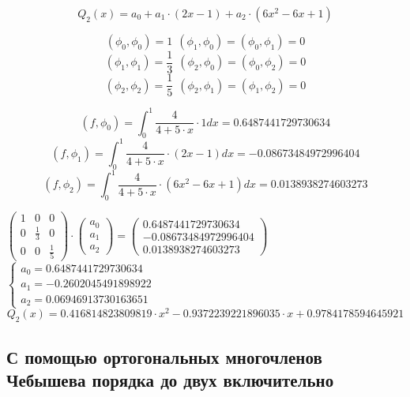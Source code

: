 \begin{displaymath}
Q_2(x) = a_0 + a_1 \cdot (2x - 1) + a_2 \cdot (6x^2 - 6x + 1)
\end{displaymath}

\begin{displaymath}
(\phi_0, \phi_0) = 1 \ \ (\phi_1, \phi_0) = (\phi_0, \phi_1) = 0
\end{displaymath}
\begin{displaymath}
(\phi_1, \phi_1) = \frac{1}{3} \ \ (\phi_2, \phi_0) = (\phi_0, \phi_2) = 0
\end{displaymath}
\begin{displaymath}
(\phi_2, \phi_2) = \frac{1}{5} \ \ (\phi_2, \phi_1) = (\phi_1, \phi_2) = 0
\end{displaymath}

\begin{displaymath}
(f, \phi_0) = \int_0^1 \frac{4}{4 + 5 \cdot x} \cdot 1 dx = 0.6487441729730634
\end{displaymath}
\begin{displaymath}
(f, \phi_1) = \int_0^1 \frac{4}{4 + 5 \cdot x} \cdot (2x - 1) dx = -0.08673484972996404
\end{displaymath}
\begin{displaymath}
(f, \phi_2) = \int_0^1 \frac{4}{4 + 5 \cdot x} \cdot (6x^2 - 6x + 1) dx = 0.0138938274603273
\end{displaymath}

$
\begin{pmatrix}
1 & 0 & 0
\\
0 & \frac{1}{3} & 0
\\
0 & 0 & \frac{1}{5}
\end{pmatrix}
\cdot
\begin{pmatrix}
a_0
\\
a_1
\\
a_2
\end{pmatrix}
=
\begin{pmatrix}
0.6487441729730634
\\
-0.08673484972996404
\\
0.0138938274603273
\end{pmatrix}
$\\[1mm]

$
 \begin{cases}
  a_0 = 0.6487441729730634
\\
  a_1 = -0.2602045491898922
\\
  a_2 = 0.06946913730163651
 \end{cases}
$\\[1mm]

\begin{displaymath}
Q_2(x) = 0.416814823809819 \cdot x^2 - 0.9372239221896035 \cdot x + 0.9784178594645921
\end{displaymath}

\subsection{С помощью ортогональных многочленов Чебышева порядка до двух включительно}



